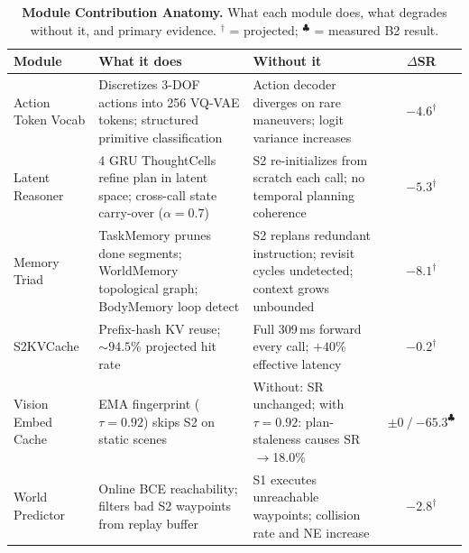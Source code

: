 \documentclass[10pt,twocolumn,letterpaper]{article}
\begin{document}
\begin{table}[h]
\centering
\caption{\textbf{Module Contribution Anatomy.} What each module does, what degrades without it, and primary evidence. $^\dagger$ = projected; $^\clubsuit$ = measured B2 result.}
\label{tab:ablation_contributions}
\footnotesize
\setlength{\tabcolsep}{2pt}
\begin{tabular}{p{1.9cm}p{2.5cm}p{2.5cm}c}
\toprule
\textbf{Module} & \textbf{What it does} & \textbf{Without it} & \textbf{$\Delta$SR} \\
\midrule
Action Token Vocab & Discretizes 3-DOF actions into 256 VQ-VAE tokens; structured primitive classification & Action decoder diverges on rare maneuvers; logit variance increases & $-4.6^\dagger$ \\
\midrule
Latent Reasoner & 4 GRU ThoughtCells refine plan in latent space; cross-call state carry-over ($\alpha=0.7$) & S2 re-initializes from scratch each call; no temporal planning coherence & $-5.3^\dagger$ \\
\midrule
Memory Triad & TaskMemory prunes done segments; WorldMemory topological graph; BodyMemory loop detect & S2 replans redundant instruction; revisit cycles undetected; context grows unbounded & $-8.1^\dagger$ \\
\midrule
S2KVCache & Prefix-hash KV reuse; ${\sim}94.5\%$ projected hit rate & Full 309\,ms forward every call; $+40\%$ effective latency & $-0.2^\dagger$ \\
\midrule
Vision Embed Cache & EMA fingerprint ($\tau=0.92$) skips S2 on static scenes & Without: SR unchanged; with $\tau=0.92$: plan-staleness causes SR$\to$18.0\% & $\pm0\ /\ {-65.3^\clubsuit}$ \\
\midrule
World Predictor & Online BCE reachability; filters bad S2 waypoints from replay buffer & S1 executes unreachable waypoints; collision rate and NE increase & $-2.8^\dagger$ \\
\bottomrule
\end{tabular}
\end{table}
\end{document}
